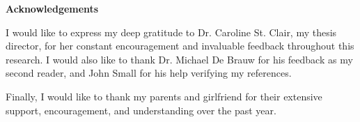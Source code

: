 \documentclass[12pt,letterpaper]{article}
\begin{document}
\clearpage\mbox{}\clearpage %

{}
\begin{center}
\textbf{\Large Acknowledgements}
\end{center}

I would like to express my deep gratitude to Dr. Caroline St. Clair, my thesis director, for her constant encouragement and invaluable feedback throughout this research.
I would also like to thank Dr. Michael De Brauw for his feedback as my second reader, and John Small for his help verifying my references.

Finally, I would like to thank my parents and girlfriend for their extensive support, encouragement, and understanding over the past year.

\newpage
\thispagestyle{empty}
\mbox{}

\cleardoublepage
{}









\end{document}
